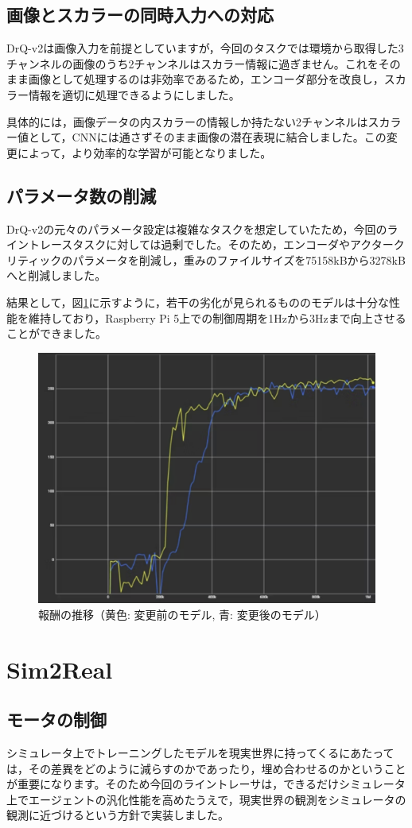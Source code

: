\subsection{画像とスカラーの同時入力への対応}
DrQ-v2は画像入力を前提としていますが，今回のタスクでは環境から取得した3チャンネルの画像のうち2チャンネルはスカラー情報に過ぎません。これをそのまま画像として処理するのは非効率であるため，エンコーダ部分を改良し，スカラー情報を適切に処理できるようにしました。

具体的には，画像データの内スカラーの情報しか持たない2チャンネルはスカラー値として，CNNには通さずそのまま画像の潜在表現に結合しました。この変更によって，より効率的な学習が可能となりました。

\subsection{パラメータ数の削減}
DrQ-v2の元々のパラメータ設定は複雑なタスクを想定していたため，今回のライントレースタスクに対しては過剰でした。そのため，エンコーダやアクタークリティックのパラメータを削減し，重みのファイルサイズを75158kBから3278kBへと削減しました。

結果として，図\ref{fig:image5}に示すように，若干の劣化が見られるもののモデルは十分な性能を維持しており，Raspberry Pi 5上での制御周期を1Hzから3Hzまで向上させることができました。
\begin{figure}[h]
  \centering
  \includegraphics[width=0.7\hsize]{line-tracer/fig/image5.png}
  \caption{報酬の推移（黄色: 変更前のモデル, 青: 変更後のモデル）}
  \label{fig:image5}
\end{figure}

\section{Sim2Real}

\subsection{モータの制御}
シミュレータ上でトレーニングしたモデルを現実世界に持ってくるにあたっては，その差異をどのように減らすのかであったり，埋め合わせるのかということが重要になります。そのため今回のライントレーサは，できるだけシミュレータ上でエージェントの汎化性能を高めたうえで，現実世界の観測をシミュレータの観測に近づけるという方針で実装しました。


